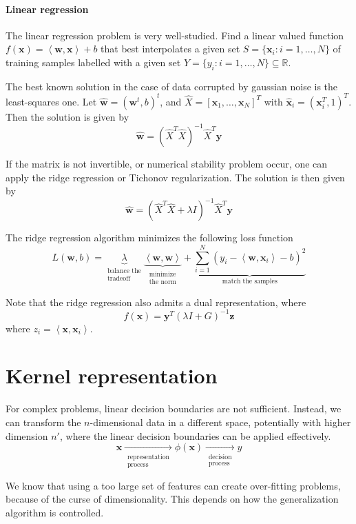 \documentclass[oneside,onecolumn]{report}
\newcommand{\inp}[2]{\left\langle #1, #2 \right\rangle}
\begin{document}
\paragraph{Linear regression}
The linear regression problem is very well-studied.
Find a linear valued function $f(\bm x) = \inp{\bm w}{\bm x} + b$ that best interpolates a given set $S = \{ \bm x_i : i = 1, \dots, N \}$ of training samples labelled with a given set $Y = \{ y_i : i = 1, \dots, N \} \subseteq \mathbb R$.

The best known solution in the case of data corrupted by gaussian noise is the least-squares one.
Let $\widehat{\bm w} = (\bm w^t, b)^t$, and $\widehat X = [\bm x_1, \dots, \bm x_N]^T$ with $\widehat {\bm x}_i = (\bm x_i^T, 1)^T$.
Then the solution is given by
$$ \widehat {\bm w} = \left( \widehat X^T \widehat X \right)^{-1} \widehat X^T \bm y $$

If the matrix is not invertible, or numerical stability problem occur, one can apply the ridge regression or Tichonov regularization.
The solution is then given by
$$ \widehat {\bm w} = \left( \widehat X^T \widehat X + \lambda I \right)^{-1} \widehat X^T \bm y $$

The ridge regression algorithm minimizes the following loss function
$$ L(\bm w, b) = \underbrace{\lambda}_{\substack{\text{balance the} \\ \text{tradeoff}}} \underbrace{ \inp{\bm w}{\bm w}}_{\substack{\text{minimize} \\ \text{the norm}}} + \underbrace{\sum_{i = 1}^N \left( y_i - \inp{\bm w}{\bm x_i} - b \right)^2}_\text{match the samples} $$

Note that the ridge regression also admits a dual representation, where
$$ f(\bm x) = \bm y^T (\lambda I + G)^{-1} \bm z $$
where $z_i = \inp{\bm x}{\bm x_i}$.

\section{Kernel representation}
For complex problems, linear decision boundaries are not sufficient.
Instead, we can transform the $n$-dimensional data in a different space, potentially with higher dimension $n'$, where the linear decision boundaries can be applied effectively.
$$ \bm x \xrightarrow[\substack{\text{representation} \\ \text{process}}]{} \phi(\bm x) \xrightarrow[\substack{\text{decision} \\ \text{process}}]{} y $$

We know that using a too large set of features can create over-fitting problems, because of the curse of dimensionality.
This depends on how the generalization algorithm is controlled.
\end{document}
